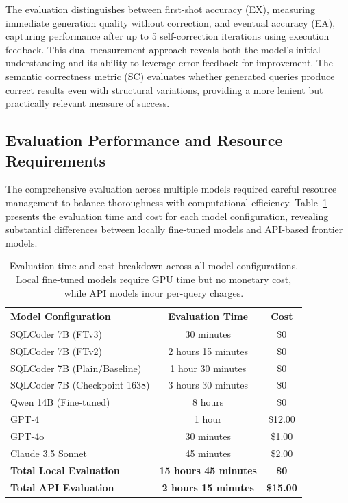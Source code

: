 The evaluation distinguishes between first-shot accuracy (EX), measuring immediate generation quality without correction, and eventual accuracy (EA), capturing performance after up to 5 self-correction iterations using execution feedback. This dual measurement approach reveals both the model's initial understanding and its ability to leverage error feedback for improvement. The semantic correctness metric (SC) evaluates whether generated queries produce correct results even with structural variations, providing a more lenient but practically relevant measure of success.

\subsection{Evaluation Performance and Resource Requirements}

The comprehensive evaluation across multiple models required careful resource management to balance thoroughness with computational efficiency. Table~\ref{tab:evaluation_performance} presents the evaluation time and cost for each model configuration, revealing substantial differences between locally fine-tuned models and API-based frontier models.

\begin{table}%
\centering
\small
\begin{tabular}{lcc}
\toprule
\textbf{Model Configuration} & \textbf{Evaluation Time} & \textbf{Cost} \\
\midrule
SQLCoder 7B (FTv3) & 30 minutes & \$0 \\
SQLCoder 7B (FTv2) & 2 hours 15 minutes & \$0 \\
SQLCoder 7B (Plain/Baseline) & 1 hour 30 minutes & \$0 \\
SQLCoder 7B (Checkpoint 1638) & 3 hours 30 minutes & \$0 \\
Qwen 14B (Fine-tuned) & 8 hours & \$0 \\
\midrule
GPT-4 & 1 hour & \$12.00 \\
GPT-4o & 30 minutes & \$1.00 \\
Claude 3.5 Sonnet & 45 minutes & \$2.00 \\
\midrule
\textbf{Total Local Evaluation} & \textbf{15 hours 45 minutes} & \textbf{\$0} \\
\textbf{Total API Evaluation} & \textbf{2 hours 15 minutes} & \textbf{\$15.00} \\
\bottomrule
\end{tabular}
\caption{Evaluation time and cost breakdown across all model configurations. Local fine-tuned models require GPU time but no monetary cost, while API models incur per-query charges.}
\label{tab:evaluation_performance}
\end{table}


